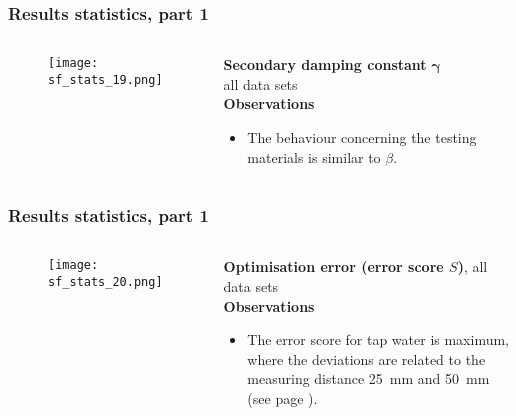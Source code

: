	\begin{frame}
		\frametitle{Results \textendash{} statistics, part 1}
		\begin{columns}[t]
			\begin{RIPcolleft}
				\begin{figure}
					\texttt{[image: sf\_stats\_19.png]}
				\end{figure}
			\end{RIPcolleft}
			\begin{RIPcolright}
				\textbf{Secondary damping constant }$\mathbf{\gamma}$\\
				all data sets\\
				\vspace*{.5em}
				\textbf{Observations}\\
				\begin{itemize}
					\item The behaviour concerning the testing materials is similar to $\beta$.
				\end{itemize}
			\end{RIPcolright}
		\end{columns}
	\end{frame}

	\begin{frame}
		\frametitle{Results \textendash{} statistics, part 1}\label{res:err1}
		\begin{columns}[t]
			\begin{RIPcolleft}
				\begin{figure}
					\texttt{[image: sf\_stats\_20.png]}
				\end{figure}
			\end{RIPcolleft}
			\begin{RIPcolright}
				\textbf{Optimisation error (error score $S$)}, all data sets\\
				\vspace*{.5em}
				\textbf{Observations}\\
				\begin{itemize}
					\item The error score for tap water is maximum, where the deviations are related to the measuring distance 25~mm and 50~mm (see page \pageref{res:err:water:dists}).
				\end{itemize}
			\end{RIPcolright}
		\end{columns}
	\end{frame}

